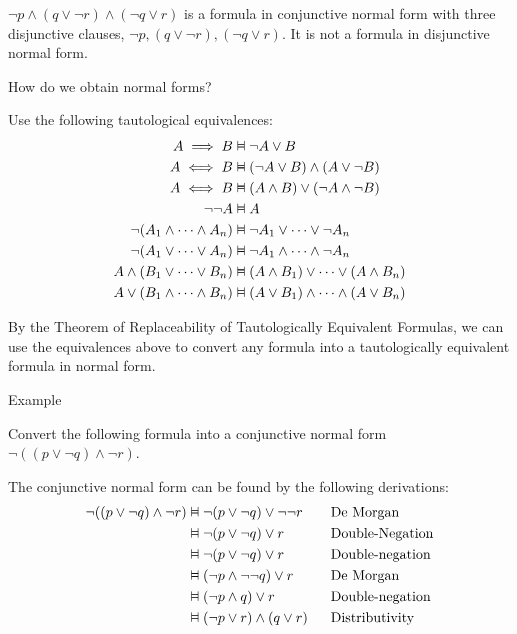 \documentclass{article}
\newcommand{\vDashv}{%
  \mathrel{%
    \text{%
      \ooalign{$\vDash$\cr\reflectbox{$\vDash$}\cr}%
    }%
  }%
}
\begin{document}
$\neg p \wedge (q \vee \neg r) \wedge (\neg q \vee r)$ is a formula in conjunctive normal form with three disjunctive clauses, $\neg p, (q \vee \neg r), (\neg q \vee r)$. It is not a formula in disjunctive normal form.

How do we obtain normal forms?

Use the following tautological equivalences:
\begin{align}
A \implies B &\vDashv \neg A \vee B \\
A \iff B &\vDashv (\neg A \vee B) \wedge (A \vee \neg B) \\
A \iff B &\vDashv (A \wedge B) \vee (\neg A \wedge \neg B) \\
\neg \neg A &\vDashv A \\
\neg (A_1 \wedge \cdots \wedge A_n) &\vDashv \neg A_1 \vee \cdots \vee \neg A_n \\
\neg (A_1 \vee \cdots \vee A_n) &\vDashv \neg A_1 \wedge \cdots \wedge \neg A_n \\
A \wedge (B_1 \vee \cdots \vee B_n) &\vDashv (A \wedge B_1) \vee \cdots \vee (A \wedge B_n) \\
A \vee (B_1 \wedge \cdots \wedge B_n) &\vDashv (A \vee B_1) \wedge \cdots \wedge (A \vee B_n)
\end{align}

By the Theorem of Replaceability of Tautologically Equivalent Formulas, we can use the equivalences above to convert any formula into a tautologically equivalent formula in normal form. 

Example

Convert the following formula into a conjunctive normal form $\neg ((p \vee \neg q) \wedge \neg r)$.

The conjunctive normal form can be found by the following derivations:
\begin{align*}
\neg ((p \vee \neg q) \wedge \neg r) &\vDashv \neg (p \vee \neg q) \vee \neg \neg r \quad &&\text{De Morgan} \\
&\vDashv \neg (p \vee \neg q) \vee r \quad &&\text{Double-Negation} \\
&\vDashv \neg (p \vee \neg q) \vee r &&\text{Double-negation} \\
&\vDashv (\neg p \wedge \neg \neg q) \vee r &&\text{De Morgan} \\
&\vDashv(\neg p \wedge q) \vee r &&\text{Double-negation} \\
&\vDashv(\neg p \vee r)\wedge (q \vee r) &&\text{Distributivity}
\end{align*}
\end{document}
